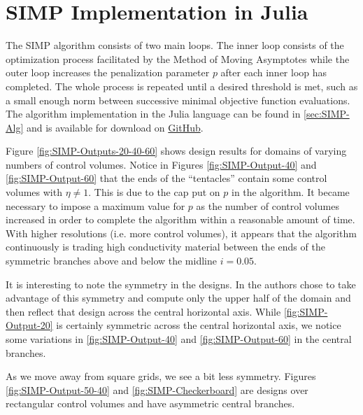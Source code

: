 \section{SIMP Implementation in Julia}

The SIMP algorithm consists of two main loops. The inner loop consists of the optimization process facilitated by the Method of Moving Asymptotes while the outer loop increases the penalization parameter $p$ after each inner loop has completed. The whole process is repeated until a desired threshold is met, such as a small enough norm between successive minimal objective function evaluations. The algorithm implementation in the Julia language can be found in \ref{sec:SIMP-Alg} and is available for download on \href{https://github.com/mikwnelson/julia-simp-optimization}{GitHub}.

Figure \ref{fig:SIMP-Outputs-20-40-60} shows design results for domains of varying numbers of control volumes. Notice in Figures \ref{fig:SIMP-Output-40} and \ref{fig:SIMP-Output-60} that the ends of the ``tentacles'' contain some control volumes with $\eta\neq 1$. This is due to the cap put on $p$ in the algorithm. It became necessary to impose a maximum value for $p$ as the number of control volumes increased in order to complete the algorithm within a reasonable amount of time. With higher resolutions (i.e. more control volumes), it appears that the algorithm continuously is trading high conductivity material between the ends of the symmetric branches above and below the midline $i=0.05$.

It is interesting to note the symmetry in the designs. In \cite{Marck2012} the authors chose to take advantage of this symmetry and compute only the upper half of the domain and then reflect that design across the central horizontal axis. While \ref{fig:SIMP-Output-20} is certainly symmetric across the central horizontal axis, we notice some variations in \ref{fig:SIMP-Output-40} and \ref{fig:SIMP-Output-60} in the central branches.

As we move away from square grids, we see a bit less symmetry. Figures \ref{fig:SIMP-Output-50-40} and \ref{fig:SIMP-Checkerboard} are designs over rectangular control volumes and have asymmetric central branches.

